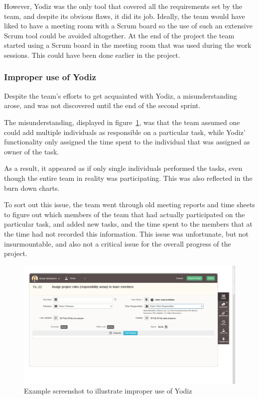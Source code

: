 However, Yodiz was the only tool that covered all the requirements set by the team, and despite its obvious flaws, it did its job. Ideally, the team would have liked to have a meeting room with a Scrum board so the use of such an extensive Scrum tool could be avoided altogether. At the end of the project the team started using a Scrum board in the meeting room that was used during the work sessions. This could have been done earlier in the project.


\subsubsection{Improper use of Yodiz}
\label{sec:improperScrum}
Despite the team's efforts to get acquainted with Yodiz, a misunderstanding arose, and was not discovered until the end of the second sprint.

The misunderstanding, displayed in figure~\ref{fig:wrongUse}, was that the team
assumed one could add multiple individuals as responsible on a particular task,
while Yodiz' functionality only assigned the time spent to the individual that was assigned as owner of the task.

As a result, it appeared as if only single individuals performed the tasks,
even though the entire team in reality was participating. This was also
reflected in the burn down charts. 

To sort out this issue, the team went through old meeting reports and time sheets
to figure out which members of the team that had actually participated on the
particular task, and added new tasks, and the time spent to the members that at
the time had not recorded this information.%
This issue was unfortunate, but not insurmountable, and also not a critical
issue for the overall progress of the project.

\begin{figure}[H]
\includegraphics[width=\textwidth, clip, trim=1cm 2cm 4cm 1cm]{ch/retrospect/fig/wrongUse.png}
\caption{Example screenshot to illustrate improper use of Yodiz}
\label{fig:wrongUse}
\end{figure}
